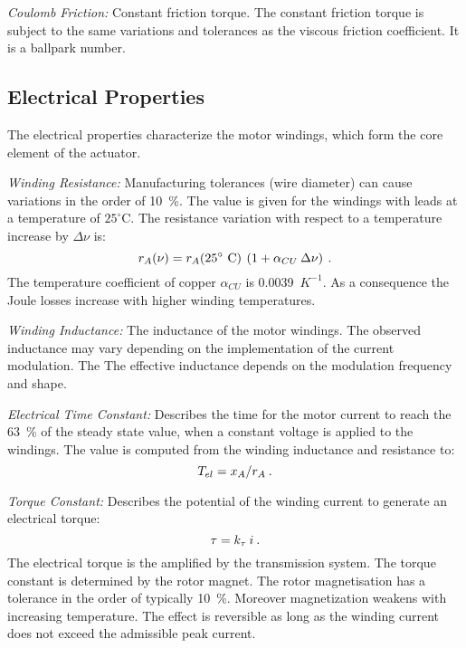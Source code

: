 \documentclass[a4paper,10pt]{cjtdsheet}      %
\begin{document}
\begin{multicols}{2}
\emph{Coulomb Friction:} Constant friction torque. The constant friction torque is subject to the same variations and tolerances as the viscous friction coefficient. It is a ballpark number.

%
%
\subsection*{Electrical Properties}
The electrical properties characterize the motor windings, which form the core element of the actuator. 

\emph{Winding Resistance:} Manufacturing tolerances (wire diameter) can cause variations in the order of 10~\%. The value is given for the windings with leads at a temperature of $25^\circ$C. The resistance variation with respect to a temperature increase by $\Delta \nu$ is:
\begin{equation}
	r_A(\nu) = r_A(25^\circ\text{ C})\:\left(1+\alpha_{CU} 	\: \Delta \nu\right)	\:.
\end{equation}
The temperature coefficient of copper $\alpha_{CU}$ is 0.0039~$K^{-1}$. As a consequence the Joule losses increase with higher winding temperatures.
 
\emph{Winding Inductance:} The inductance of the motor windings. The observed inductance may vary depending on the implementation of the current modulation. The The effective inductance depends on the modulation frequency and shape.

\emph{Electrical Time Constant:} Describes the time for the motor current to reach the 63~\% of the steady state value, when a constant voltage is applied to the windings. The value is computed from the winding inductance and resistance to:
\begin{equation}
T_{el} = x_A / r_A\:.
\end{equation}

\emph{Torque Constant:} Describes the potential of the winding current to generate an electrical torque:
\begin{equation}
	\tau = k_\tau \: i\:.
\end{equation}
The electrical torque is the amplified by the transmission system. The torque constant is determined by the rotor magnet. The rotor magnetisation has a tolerance in the order of typically 10~\%. Moreover magnetization weakens with increasing temperature. The effect is reversible as long as the winding current does not exceed the admissible peak current.


\end{multicols}
\end{document}
